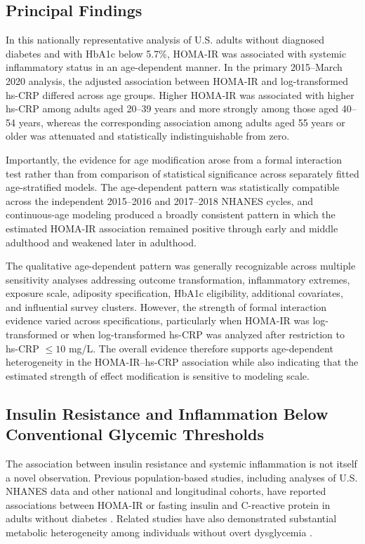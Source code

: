 \documentclass[11pt]{article}
\begin{document}
\subsection{Principal Findings}

In this nationally representative analysis of U.S. adults without
diagnosed diabetes and with HbA1c below 5.7\%, HOMA-IR was associated
with systemic inflammatory status in an age-dependent manner. In the
primary 2015--March 2020 analysis, the adjusted association between
HOMA-IR and log-transformed hs-CRP differed across age groups. Higher
HOMA-IR was associated with higher hs-CRP among adults aged 20--39 years
and more strongly among those aged 40--54 years, whereas the corresponding
association among adults aged 55 years or older was attenuated and
statistically indistinguishable from zero.

Importantly, the evidence for age modification arose from a formal
interaction test rather than from comparison of statistical significance
across separately fitted age-stratified models. The age-dependent pattern
was statistically compatible across the independent 2015--2016 and
2017--2018 NHANES cycles, and continuous-age modeling produced a broadly
consistent pattern in which the estimated HOMA-IR association remained
positive through early and middle adulthood and weakened later in
adulthood.

The qualitative age-dependent pattern was generally recognizable across
multiple sensitivity analyses addressing outcome transformation,
inflammatory extremes, exposure scale, adiposity specification, HbA1c
eligibility, additional covariates, and influential survey clusters.
However, the strength of formal interaction evidence varied across
specifications, particularly when HOMA-IR was log-transformed or when
log-transformed hs-CRP was analyzed after restriction to hs-CRP
$\leq10$ mg/L. The overall evidence therefore supports age-dependent
heterogeneity in the HOMA-IR--hs-CRP association while also indicating
that the estimated strength of effect modification is sensitive to
modeling scale.


\subsection{Insulin Resistance and Inflammation Below Conventional
Glycemic Thresholds}

The association between insulin resistance and systemic inflammation is
not itself a novel observation. Previous population-based studies,
including analyses of U.S. NHANES data and other national and longitudinal
cohorts, have reported associations between HOMA-IR or fasting insulin and
C-reactive protein in adults without diabetes
\citep{Chen2004,Meng2007,Park2009,Missel2021}. Related studies have also
demonstrated substantial metabolic heterogeneity among individuals without
overt dysglycemia \citep{Caporaso2020}.
\end{document}
